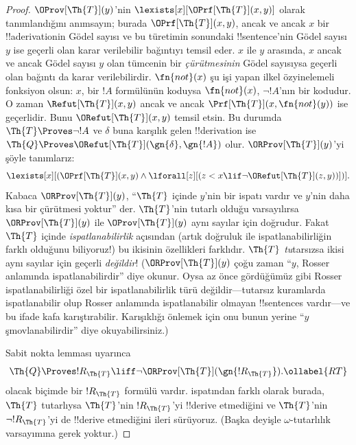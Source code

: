 \begin{proof}
$\OProv[\Th{T}](y)$'nin $\lexists[x][\OPrf[\Th{T}](x,y)]$ olarak
tanımlandığını anımsayın; burada $\OPrf[\Th{T}](x,y)$, ancak ve ancak $x$ bir
!!a{derivation}{}in G\"odel sayısı ve bu türetimin sonundaki !!{sentence}'nin
G\"odel sayısı $y$ ise geçerli olan karar verilebilir bağıntıyı temsil eder. $x$ ile $y$
arasında, $x$ ancak ve ancak G\"odel sayısı $y$ olan tümcenin bir
\emph{çürütmesinin} G\"odel sayısıysa geçerli olan bağıntı da karar
verilebilirdir. $\fn{not}(x)$ şu işi yapan ilkel özyinelemeli fonksiyon olsun:
$x$, bir $!A$ formülünün koduysa $\fn{not}(x)$, $\lnot !A$'nın bir kodudur.
O zaman $\Refut[\Th{T}](x,y)$ ancak ve ancak
$\Prf[\Th{T}](x,\fn{not}(y))$ ise geçerlidir. Bunu
$\ORefut[\Th{T}](x,y)$ temsil etsin. Bu durumda $\Th{T} \Proves \lnot !A$
ve $\delta$ buna karşılık gelen !!{derivation} ise
$\Th{Q} \Proves \ORefut[\Th{T}](\gn{\delta},\gn{!A})$ olur.
$\ORProv[\Th{T}](y)$'yi şöyle tanımlarız:
\[
\lexists[x][(\OPrf[\Th{T}](x,y) \land \lforall[z][(z < x \lif \lnot
  \ORefut[\Th{T}](z,y))])].
\]
Kabaca $\ORProv[\Th{T}](y)$, ``$\Th{T}$ içinde $y$'nin bir ispatı vardır ve
$y$'nin daha kısa bir çürütmesi yoktur'' der. $\Th{T}$'nin tutarlı olduğu
varsayılırsa $\ORProv[\Th{T}](y)$ ile $\OProv[\Th{T}](y)$ aynı sayılar için
doğrudur. Fakat $\Th{T}$ içinde \emph{ispatlanabilirlik} açısından (artık
doğruluk ile ispatlanabilirliğin farklı olduğunu biliyoruz!) bu ikisinin
özellikleri farklıdır. $\Th{T}$ \emph{tu}tarsızsa ikisi aynı sayılar için
geçerli \emph{değildir}!{} ($\ORProv[\Th{T}](y)$ çoğu zaman ``$y$, Rosser
anlamında ispatlanabilirdir'' diye okunur. Oysa az önce gördüğümüz gibi Rosser
ispatlanabilirliği özel bir ispatlanabilirlik türü değildir---tutarsız
kuramlarda ispatlanabilir olup Rosser anlamında ispatlanabilir olmayan
!!{sentence}s vardır---ve bu ifade kafa karıştırabilir. Karışıklığı önlemek
için onu bunun yerine ``$y$ şmovlanabilirdir'' diye okuyabilirsiniz.)

Sabit nokta lemması uyarınca
\begin{equation}
  \Th{Q} \Proves !R_\Th{T} \liff \lnot \ORProv[\Th{T}](\gn{!R_\Th{T}}).
  \ollabel{RT}
\end{equation}
olacak biçimde bir $!R_\Th{T}$ formülü vardır.
 ispatından farklı olarak burada,
$\Th{T}$ tutarlıysa $\Th{T}$'nin $!R_\Th{T}$'yi !!{derive} etmediğini ve
$\Th{T}$'nin $\lnot !R_\Th{T}$'yi de !!{derive} etmediğini ileri sürüyoruz. (Başka deyişle
$\omega$-tutarlılık varsayımına gerek yoktur.)


\end{proof}
